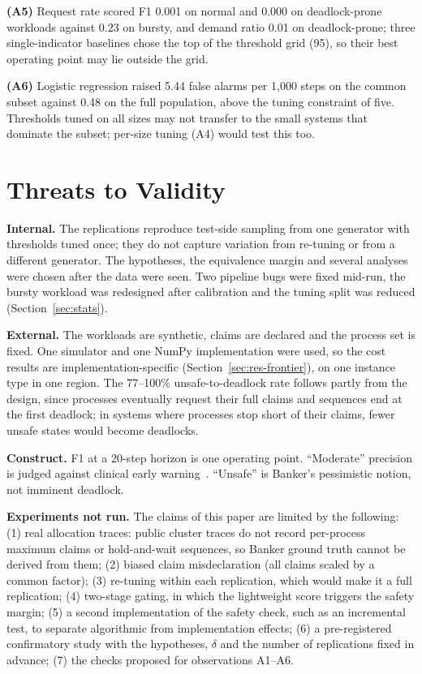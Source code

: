 \documentclass[conference]{IEEEtran}
\begin{document}
\textbf{(A5)} Request rate scored F1 0.001 on normal and 0.000 on deadlock-prone workloads against 0.23 on bursty, and demand ratio 0.01 on deadlock-prone; three single-indicator baselines chose the top of the threshold grid (95), so their best operating point may lie outside the grid.

\textbf{(A6)} Logistic regression raised 5.44 false alarms per 1,000 steps on the common subset against 0.48 on the full population, above the tuning constraint of five. Thresholds tuned on all sizes may not transfer to the small systems that dominate the subset; per-size tuning (A4) would test this too.

\section{Threats to Validity}\label{sec:threats}
\textbf{Internal.} The replications reproduce test-side sampling from one generator with thresholds tuned once; they do not capture variation from re-tuning or from a different generator. The hypotheses, the equivalence margin and several analyses were chosen after the data were seen. Two pipeline bugs were fixed mid-run, the bursty workload was redesigned after calibration and the tuning split was reduced (Section~\ref{sec:stats}).

\textbf{External.} The workloads are synthetic, claims are declared and the process set is fixed. One simulator and one NumPy implementation were used, so the cost results are implementation-specific (Section~\ref{sec:res-frontier}), on one instance type in one region. The 77--100\% unsafe-to-deadlock rate follows partly from the design, since processes eventually request their full claims and sequences end at the first deadlock; in systems where processes stop short of their claims, fewer unsafe states would become deadlocks.

\textbf{Construct.} F1 at a 20-step horizon is one operating point. ``Moderate'' precision is judged against clinical early warning~\cite{Hyland2020}. ``Unsafe'' is Banker's pessimistic notion, not imminent deadlock.

\textbf{Experiments not run.} The claims of this paper are limited by the following: (1) real allocation traces: public cluster traces do not record per-process maximum claims or hold-and-wait sequences, so Banker ground truth cannot be derived from them; (2) biased claim misdeclaration (all claims scaled by a common factor); (3) re-tuning within each replication, which would make it a full replication; (4) two-stage gating, in which the lightweight score triggers the safety margin; (5) a second implementation of the safety check, such as an incremental test, to separate algorithmic from implementation effects; (6) a pre-registered confirmatory study with the hypotheses, $\delta$ and the number of replications fixed in advance; (7) the checks proposed for observations A1--A6.
\end{document}
